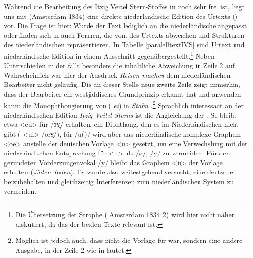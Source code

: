 Während die Bearbeitung des Itzig Veitel Stern-Stoffes in   noch sehr frei ist, liegt uns mit  (Amsterdam 1834) eine direkte niederländische Edition des Urtexts () vor. Die Frage ist hier: Wurde der Text  lediglich an die niederländische  angepasst oder finden sich in  auch Formen, die vom \hai{{\SWJ}} des Urtexts abweichen und Strukturen des niederländischen \hai{{\NWJ}} repräsentieren. In Tabelle \ref{paralelltextIVS} sind Urtext und niederländische Edition in einem Ausschnitt gegenübergestellt.\footnote{Die {\ndl} Übersetzung der Strophe ( Amsterdam 1834:\,2) wird hier nicht näher diskutiert, da das \hai{{\LiJi}} der beiden Texte relevant ist.} Neben Unterschieden in der  fällt besonders die inhaltliche Abweichung in Zeile 2 auf. Wahrscheinlich war hier der Ausdruck \textit{Reisen machen} dem niederländischen Bearbeiter nicht geläufig. Die an dieser Stelle neue zweite Zeile zeigt immerhin, dass der Bearbeiter ein westjiddisches Grundprinzip erkannt hat und anwenden kann: die Monophthongierung von  ({\mhd} \textit{ei}) in \textit{Stahn} .\footnote{Möglich ist jedoch auch, dass nicht  die Vorlage für  war, sondern eine andere Ausgabe, in der Zeile 2 wie in  lautet.} Sprachlich interessant an der niederländischen Edition \textit{Itzig Veitel Sterns} ist die Angleichung der . So bleibt etwa <eu> für /ɔʏ̯/ erhalten, ein Diphthong, den es im Niederländischen nicht gibt ({\ndl} <ui> /œʏ̯/), für /u(\textlengthmark)/ wird aber das niederländische komplexe Graphem <oe> anstelle der deutschen Vorlage <u> gesetzt, um eine Verwechslung mit der niederländischen Entsprechung für <u> als /ø/, /y\textlengthmark/ zu vermeiden. Für den gerundeten Vorderzungenvokal /y/ bleibt das Graphem <ü> der Vorlage erhalten (\textit{Jüden}  {\ndl} \textit{Joden}). Es wurde also weitestgehend versucht, eine deutsche  beizubehalten und gleichzeitig Interferenzen zum niederländischen System zu vermeiden.
 

